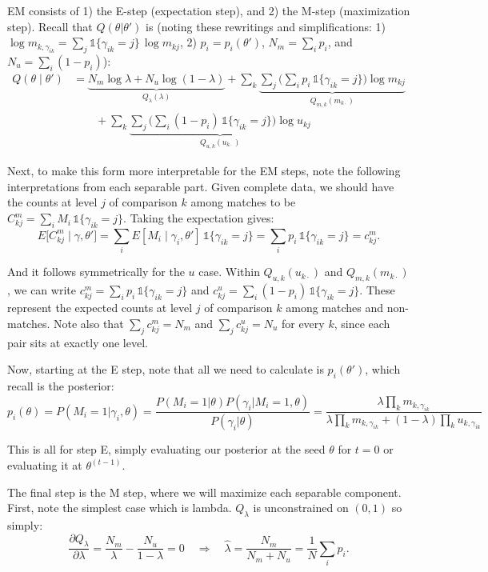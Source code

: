 \documentclass[11pt]{article}
\begin{document}
EM consists of 1) the E-step (expectation step), and 2) the M-step (maximization step). Recall that $Q(\theta | \theta')$ is (noting these rewritings and simplifications: 1) $\log m_{k,\gamma_{ik}} = \sum_{j} \mathds{1}\{\gamma_{ik}=j\} \, \log m_{kj}$, 2) $p_i = p_i(\theta')$, $N_m = \sum_i p_i$, and $N_u = \sum_i (1 - p_i)$):
\[
\begin{aligned}
Q(\theta \mid \theta')
&= \underbrace{N_m \log \lambda + N_u \log(1-\lambda)}_{Q_\lambda(\lambda)}
+ \sum_{k} \underbrace{\sum_{j} \Big( \sum_{i} p_i \, \mathds{1}\{\gamma_{ik}=j\} \Big) \log m_{kj}}_{Q_{m,k}(m_{k\cdot})} \\
&\qquad + \sum_{k} \underbrace{\sum_{j} \Big( \sum_{i} (1-p_i) \, \mathds{1}\{\gamma_{ik}=j\} \Big) \log u_{kj}}_{Q_{u,k}(u_{k\cdot})}
\end{aligned}
\]

Next, to make this form more interpretable for the EM steps, note the following interpretations from each separable part. Given complete data, we should have the counts at level $j$ of comparison $k$ among matches to be $C^m_{kj} = \sum_i M_i \, \mathds{1}\{\gamma_{ik}=j\}$. Taking the expectation gives:
\[
E\big[C^m_{kj} \mid \gamma, \theta'\big]
= \sum_i E[M_i \mid \gamma_i, \theta'] \, \mathds{1}\{\gamma_{ik}=j\}
= \sum_i p_i \, \mathds{1}\{\gamma_{ik}=j\}
= c^m_{kj}.
\]

And it follows symmetrically for the $u$ case. Within $Q_{u,k}(u_{k\cdot})$ and $Q_{m,k}(m_{k\cdot})$, we can write $c^m_{kj} = \sum_i p_i \, \mathds{1}\{\gamma_{ik}=j\}$ and $c^u_{kj} = \sum_i (1-p_i)\, \mathds{1}\{\gamma_{ik}=j\}$. These represent the expected counts at level $j$ of comparison $k$ among matches and non-matches. Note also that $\sum_j c^m_{kj} = N_m$ and $\sum_j c^u_{kj} = N_u$ for every $k$, since each pair sits at exactly one level.

Now, starting at the E step, note that all we need to calculate is $p_i(\theta')$, which recall is the posterior:
\[
p_i(\theta) = P(M_i = 1 | \gamma_i, \theta) =  \frac{P(M_i = 1 | \theta)P(\gamma_i | M_i = 1, \theta)}{P(\gamma_i | \theta)}
= \frac{\lambda \prod_k m_{k,\gamma_{ik}}}{\lambda \prod_k m_{k,\gamma_{ik}} + (1-\lambda) \prod_k u_{k,\gamma_{ik}}}
\]

This is all for step E, simply evaluating our posterior at the seed $\theta$ for $t=0$ or evaluating it at $\theta^{(t-1)}$.

The final step is the M step, where we will maximize each separable component. First, note the simplest case which is lambda. $Q_\lambda$ is unconstrained on $(0,1)$ so simply:
\[
\frac{\partial Q_\lambda}{\partial \lambda} = \frac{N_m}{\lambda} - \frac{N_u}{1-\lambda} = 0
\quad\Longrightarrow\quad
\hat\lambda = \frac{N_m}{N_m + N_u} = \frac{1}{N}\sum_i p_i .
\]
\end{document}
